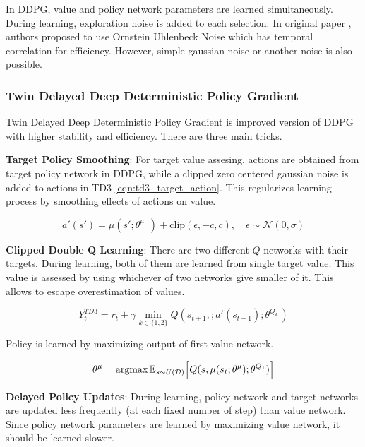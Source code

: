 In DDPG, value and policy network parameters are learned simultaneously. During learning, exploration noise is added to each selection. In original paper \cite{lillicrap_continuous_2019}, authors proposed to use Ornstein Uhlenbeck Noise \cite{uhlenbeck_theory_1930} which has temporal correlation for efficiency. However, simple gaussian noise or another noise is also possible.

\subsubsection{Twin Delayed Deep Deterministic Policy Gradient}
Twin Delayed Deep Deterministic Policy Gradient \cite{fujimoto_addressing_2018} is improved version of DDPG with higher stability and efficiency. There are three main tricks.

\textbf{Target Policy Smoothing}: For target value assesing, actions are obtained from target policy network in DDPG, while a clipped zero centered gaussian noise is added to actions in TD3 \ref{eqn:td3_target_action}. This regularizes learning process by smoothing effects of actions on value. 

\begin{equation}
\label{eqn:td3_target_action}
a'(s') = \mu(s';\theta^{\mu^-}) + \mathrm{clip}(\epsilon, -c, c), \quad \epsilon \sim \mathcal{N}(0, \sigma)
\end{equation}

\textbf{Clipped Double Q Learning}: There are two different $Q$ networks with their targets. During learning, both of them are learned from single target value. This value is assessed by using whichever of two networks give smaller of it. This allows to escape overestimation of values. 

\begin{equation}
\label{eqn:td3_target}
Y_t^{TD3} = r_t + \gamma \min_{k\in\{1,2\}} Q(s_{t+1}, ;a'(s_{t+1});\theta^{Q_k^-})
\end{equation}

Policy is learned by maximizing output of first value network.

\begin{equation}
\label{eqn:td3_value_maximization}
\theta^\mu = \operatorname{\textup{argmax}} \mathbb{E}_{s \sim U(\mathcal{D})} \Big[ Q(s, \mu(s_t;\theta^\mu);\theta^{Q_1}) \Big]
\end{equation}

\textbf{Delayed Policy Updates}: During learning, policy network and target networks are updated less frequently (at each fixed number of step) than value network. Since policy network parameters are learned by maximizing value network, it should be learned slower.
